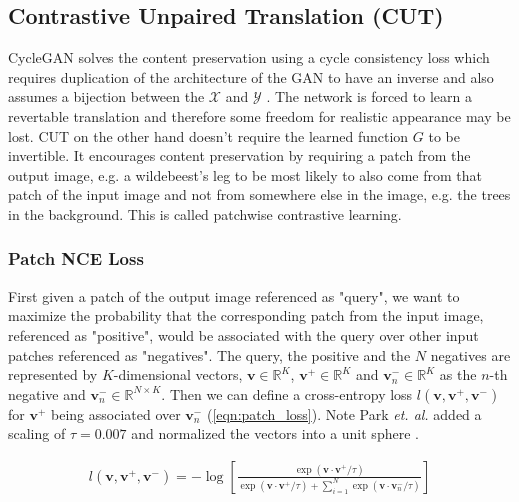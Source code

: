 \documentclass[a4paper,11pt, DIV=12]{scrartcl}
\newcommand{\vp}{\boldsymbol{v}^+}
\newcommand{\vm}{\boldsymbol{v}^-}
\newcommand{\ve}{\boldsymbol{v}}
\begin{document}
\subsection{Contrastive Unpaired Translation (CUT)}
CycleGAN solves the content preservation using a cycle consistency loss which requires duplication of the architecture
of the GAN to have an inverse and also assumes a bijection between the $\mathcal{X}$ and $\mathcal{Y}$ \cite{cyclegan_orig}.
The network is forced to learn a revertable translation and therefore some freedom for realistic appearance may be lost.
CUT on the other hand doesn't require the learned function $G$ to be invertible.
It encourages content preservation by requiring a patch from the output image, e.g. a wildebeest's leg to be most likely to also come from that patch
of the input image and not from somewhere else in the image, e.g. the trees in the background. \cite{cut} This is called patchwise contrastive learning.

\subsubsection*{Patch NCE Loss} %
First given a patch of the output image referenced as "query", we want to maximize the probability that the corresponding
patch from the input image, referenced as "positive", would be associated with the query over other input patches referenced
as "negatives".
The query, the positive and the $N$ negatives are represented by $K$-dimensional vectors, $\ve \in \mathbb{R}^K$, $\vp \in \mathbb{R}^K$
and $\vm_n \in \mathbb{R}^K$ as the $n$-th negative and $\ve_n^- \in \mathbb{R}^{N \times K}$.
Then we can define a cross-entropy loss $l(\ve, \vp, \vm)$ for $\vp$ being associated over $\vm_n$ (\autoref{eqn:patch_loss}).
Note Park \textit{et. al.} added a scaling of $\tau = 0.007$ and normalized the vectors into a unit sphere \cite{cut}.

\begin{equation}
   \label{eqn:patch_loss}
   \begin{aligned}
      l(\ve, \vp, \vm) = - \log \left[ \frac{\exp(\ve \cdot \vp / \tau)}{\exp(\ve \cdot \vp / \tau) + \sum_{i=1}^N\exp(\ve \cdot \ve_n^- / \tau)}\right]
   \end{aligned}
\end{equation}
\end{document}
